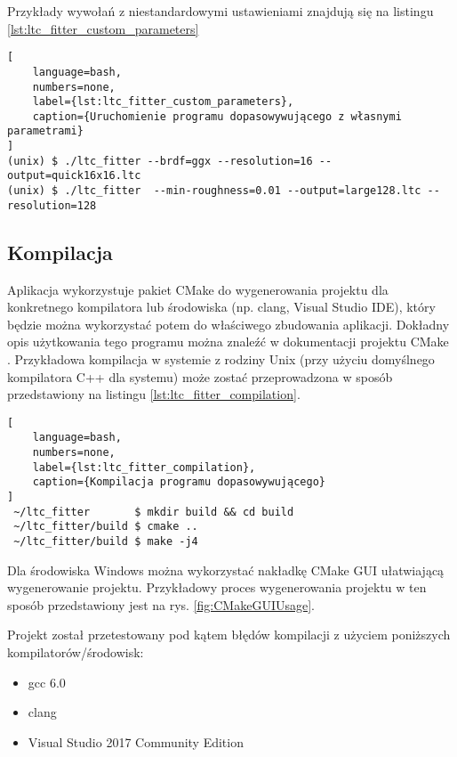 \documentclass[../main.tex]{subfiles}
\begin{document}
Przykłady wywołań z niestandardowymi ustawieniami znajdują się na listingu \ref{lst:ltc_fitter_custom_parameters}

\begin{lstlisting}[
    language=bash,
    numbers=none,
    label={lst:ltc_fitter_custom_parameters},
    caption={Uruchomienie programu dopasowywującego z własnymi parametrami}
]
(unix) $ ./ltc_fitter --brdf=ggx --resolution=16 --output=quick16x16.ltc
(unix) $ ./ltc_fitter  --min-roughness=0.01 --output=large128.ltc --resolution=128
\end{lstlisting}

\subsection{Kompilacja}
\label{section:ltcFitterCompilation}

Aplikacja wykorzystuje pakiet CMake do wygenerowania projektu dla konkretnego kompilatora lub środowiska (np. clang, Visual Studio IDE), który będzie można wykorzystać potem do właściwego zbudowania aplikacji. Dokładny opis użytkowania tego programu można znaleźć w dokumentacji projektu CMake \cite{CMakeDoc}. Przykładowa kompilacja w systemie z rodziny Unix (przy użyciu domyślnego kompilatora C++ dla systemu) może zostać przeprowadzona w sposób przedstawiony na listingu \ref{lst:ltc_fitter_compilation}.

\begin{lstlisting}[
    language=bash,
    numbers=none,
    label={lst:ltc_fitter_compilation},
    caption={Kompilacja programu dopasowywującego}
]
 ~/ltc_fitter       $ mkdir build && cd build
 ~/ltc_fitter/build $ cmake ..
 ~/ltc_fitter/build $ make -j4
\end{lstlisting}

Dla środowiska Windows można wykorzystać nakładkę CMake GUI ułatwiającą wygenerowanie projektu. Przykładowy proces wygenerowania projektu w ten sposób przedstawiony jest na rys. \ref{fig:CMakeGUIUsage}.

Projekt został przetestowany pod kątem błędów kompilacji z użyciem poniższych kompilatorów/środowisk:
\begin{itemize}
    \item gcc 6.0
    \item clang
    \item Visual Studio 2017 Community Edition
\end{itemize}
\end{document}
